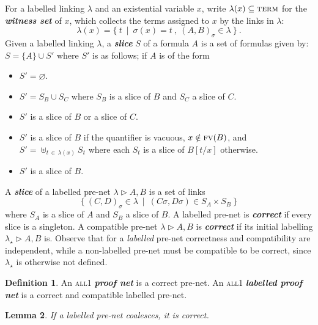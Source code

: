 \documentclass{article}
\theoremstyle{definition}
\newtheorem{definition}{Definition}
\theoremstyle{plain}
\newtheorem{lemma}[definition]{Lemma}
\newcommand\defn[1]{\textit{\textbf{#1}}}
\newcommand\terms{\textsc{term}}
\newcommand\all{\textsc{all}}
\newcommand\+{+}
\renewcommand\*{\times}
\newcommand\fv{\textsc{fv}}
\newcommand\net[3]{#1\triangleright #2,#3}
\newcommand\clink[3][\sigma]{(#2,#3)_{#1}}
\begin{document}
For a labelled linking $\lambda$ and an existential variable $x$, write $\lambda(x)\subseteq\terms$ for the \defn{witness set} of $x$, which collects the terms assigned to $x$ by the links in $\lambda$:
\[
	\lambda(x) = \{~t~\mid~\sigma(x) = t~,~\clink AB\in\lambda~\}~.
\]
%
Given a labelled linking $\lambda$, a \defn{slice} $S$ of a formula $A$ is a set of formulas given by: $S=\{A\}\cup S'$ where $S'$ is as follows; if $A$ is of the form
%
\begin{itemize}
	\item
{}				$S'=\varnothing$.
	\item
\makebox[40pt][l]{$B\+C$:} 			$S'=S_B\cup S_C$ where $S_B$ is a slice of $B$ and $S_C$ a slice of $C$.
	\item
\makebox[40pt][l]{$B\*C$:}			$S'$ is a slice of $B$ or a slice of $C$.
	\item
{}	$S'$ is a slice of $B$ if the quantifier is vacuous, $x\notin\fv(B)$, and
	\\[\itemsep]
	\hspace*{40pt}					$S'=\uplus_{t\,\in\,\lambda(x)}S_t$ where each $S_t$ is a slice of $B[t/x]$ otherwise.
	\item
{}	$S'$ is a slice of $B$.
\end{itemize}
%
A \defn{slice} of a labelled pre-net $\net\lambda AB$ is a set of links
\[
	\{~\clink CD\in \lambda~\mid~(C\sigma,D\sigma)\in S_A\times S_B~\}
\]
where $S_A$ is a slice of $A$ and $S_B$ a slice of $B$. A labelled pre-net is \defn{correct} if every slice is a singleton. A compatible pre-net $\net\lambda AB$ is \defn{correct} if its initial labelling $\net{\lambda_\star}AB$ is. Observe that for a \emph{labelled} pre-net correctness and compatibility are independent, while a non-labelled pre-net must be compatible to be correct, since $\lambda_\star$ is otherwise not defined.

\begin{definition}
An \all1 \defn{proof net} is a correct pre-net. An \all1 \defn{labelled proof net} is a correct and compatible labelled pre-net.
\end{definition}

\begin{lemma}
If a labelled pre-net coalesces, it is correct. 
\end{lemma}
\end{document}
